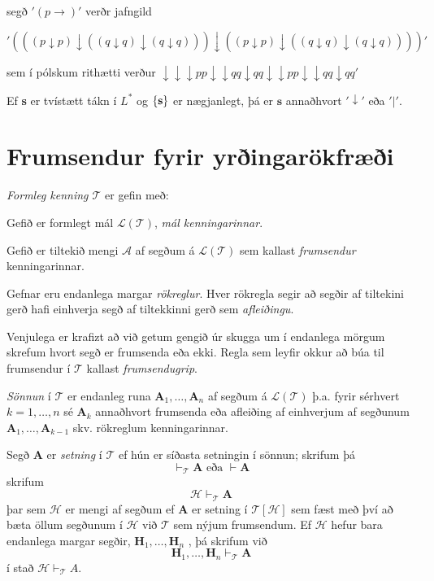 \documentclass[12pt]{article}
\begin{document}
segð $'(p \rightarrow)'$ verðr jafngild

\['(((p \downarrow  p) \downarrow (( q \downarrow q) \downarrow (q \downarrow q))) \downarrow (( p \downarrow p) \downarrow ((q \downarrow q) \downarrow (q \downarrow q))))' \]

sem í pólskum rithætti verður $ \downarrow \downarrow \downarrow  p p  \downarrow \downarrow q q  \downarrow q q  \downarrow \downarrow p p  \downarrow \downarrow q q  \downarrow q q'$

\begin{setn}
Ef \textbf{s} er tvístætt tákn í $L^{*}$ og $\{\textbf{s}\}$ er
nægjanlegt, þá er $\textbf{s}$ annaðhvort $'\downarrow'$ eða $'|'$.

\end{setn}


\section{Frumsendur fyrir yrðingarökfræði}

\begin{skgr}
  \emph{Formleg kenning $\mathcal{T}$} er gefin með:
  \begin{anum}
  \item Gefið er formlegt mál $\mathcal{L(T)}$, \emph{mál kenningarinnar}.
  \item  Gefið er tiltekið mengi $\mathcal{A}$ af segðum á $\mathcal{L(T)}$
    sem kallast \emph{frumsendur} kenningarinnar.
  \item Gefnar eru endanlega margar \emph{rökreglur}. Hver rökregla segir
    að segðir af tiltekini gerð hafi einhverja segð af tiltekkinni gerð sem \emph{afleiðingu}.
  \end{anum}
    Venjulega er krafizt að við getum gengið úr skugga um í endanlega mörgum skrefum
    hvort segð er frumsenda eða ekki. Regla sem leyfir okkur að búa til frumsendur í
    $\mathcal{T}$ kallast \emph{frumsendugrip}.

    \emph{Sönnun} í $\mathcal{T}$ er endanleg runa $\textbf{A}_1, \dotsc, \textbf{A}_n$
    af segðum á $\mathcal{L(T)}$ þ.a. fyrir sérhvert $k = 1, \dotsc, n$ sé $\textbf{A}_k$
    annaðhvort frumsenda eða afleiðing af einhverjum af segðunum
    $\textbf{A}_1, \dotsc, \textbf{A}_{k-1}$ skv. rökreglum kenningarinnar.

    Segð $\textbf{A}$ er \emph{setning} í $\mathcal{T}$ ef hún er síðasta setningin
    í sönnun; skrifum þá
    \[ \vdash_{\mathcal{T}} \textbf{A} \text{ eða } \vdash \textbf{A}\]
    skrifum
    \[ \mathcal{H} \vdash_{\mathcal{T}} \textbf{A} \]
    þar sem $\mathcal{H}$ er mengi af segðum ef
    $\textbf{A}$ er setning í $\mathcal{T[H]}$ sem fæst með því að bæta
    öllum segðunum í $\mathcal{H}$ við $\mathcal{T}$ sem nýjum frumsendum.
    Ef $\mathcal{H}$ hefur bara endanlega margar segðir,
    $\textbf{H}_1, \dotsc, \textbf{H}_n$ , þá skrifum við
    \[\textbf{H}_1, \dotsc, \textbf{H}_n \vdash_{\mathcal{T}} \textbf{A}\]
    í stað $\mathcal{H} \vdash_{\mathcal{T}} A$.
\end{skgr}
\end{document}
